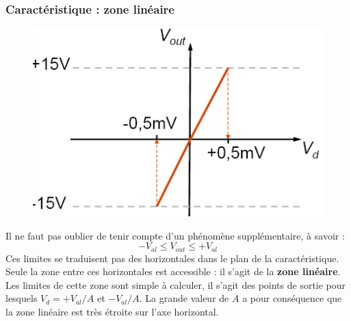 \documentclass	[11pt, a4paper, openany]{book}
\begin{document}
\subsubsection{Caractéristique : zone linéaire}
\begin{figure}
\includegraphics[scale=0.25]{img/image43}
\end{figure}
Il ne faut pas oublier de tenir compte d'un phénomène supplémentaire, à savoir :
\begin{equation}
-V_{al} \leq V_{out} \leq +V_{al}
\end{equation}
Ces limites se traduisent pas des horizontales dans le plan de la caractéristique. Seule la zone entre ces horizontales est accessible : il s'agit de la \textbf{zone linéaire}.\\
Les limites de cette zone sont simple à calculer, il s'agit des points de sortie pour lesquels $V_{d} = +V_{al}/A$ et $-V_{al}/A$. La grande valeur de $A$ a pour conséquence que la zone linéaire est très étroite sur l'axe horizontal.
\end{document}
